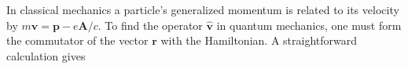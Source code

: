 In classical mechanics a particle's generalized momentum is related to its velocity by $m\mathbf v=\mathbf p-e\mathbf A/c$. To find the operator $\hat{\mathbf v}$ in quantum mechanics, one must form the commutator of the vector $\mathbf r$ with the Hamiltonian. A straightforward calculation gives
